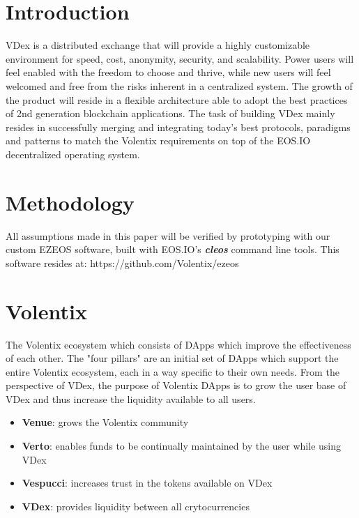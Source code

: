 \documentclass[]{article}
\begin{document}
\section{Introduction}

VDex is a distributed exchange that will provide a highly customizable environment for speed, cost, 
anonymity, security, and scalability. 
Power users will feel enabled with the freedom to choose and thrive, 
while new users will feel welcomed and free from the risks inherent in a centralized system. 
The growth of the product will reside in a flexible architecture 
able to adopt the best practices of 2nd generation blockchain applications.  
The task of building VDex mainly resides in successfully merging
and integrating today's best protocols, paradigms and patterns to match the 
Volentix requirements on top of the EOS.IO decentralized operating system.
%
 	
\section{Methodology}

All assumptions made in this paper will be verified by prototyping with our custom EZEOS software, built
with EOS.IO's \textbf{\textit{cleos}} command line tools. This software resides at: https://github.com/Volentix/ezeos

\section{Volentix}	
The Volentix ecosystem which consists of DApps which improve the effectiveness of each other.
The "four pillars" are an initial set of DApps which support the entire Volentix ecosystem,
each in a way specific to their own needs.
From the perspective of VDex, the purpose of Volentix DApps is to grow the user base of VDex
and thus increase the liquidity available to all users.

\begin{itemize}

\item \textbf{Venue}: grows the Volentix community
\item \textbf{Verto}: enables funds to be continually maintained by the user while using VDex
\item \textbf{Vespucci}: increases trust in the tokens available on VDex
\item \textbf{VDex}: provides liquidity between all crytocurrencies
\end{itemize}
\end{document}
